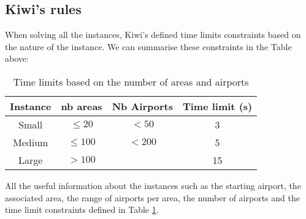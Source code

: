 \subsection{Kiwi's rules}
When solving all the instances, Kiwi's defined time limits constraints based on the nature of the instance. We can summarise these constraints in the Table above:
\begin{table}[!ht]
    \centering
    \begin{tabular}{||cccc||} 
     \toprule
     Instance & nb areas & Nb Airports & Time limit (s) \\ [1ex] 
     \midrule
     Small  & $\leq 20$  & $<50$  & 3  \\ 
     Medium & $\leq 100$ & $<200$ & 5  \\
     Large  & $>100$     &        & 15 \\ [1ex] 
     \bottomrule
    \end{tabular}
    \caption{Time limits based on the number of areas and airports}
    \label{table:Time limit constraints}
\end{table}

All the useful information about the instances such as the starting airport, the associated area, the range of airports per area, the number of airports and the time limit constraints defined in  Table \ref{table:Time limit constraints}.

